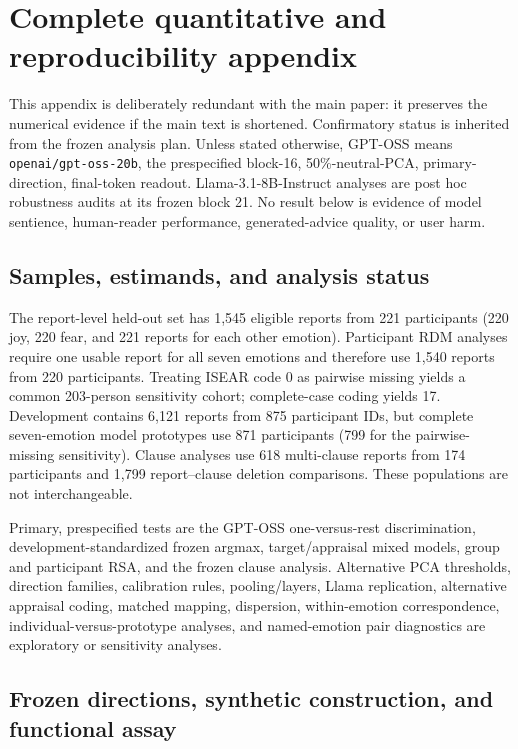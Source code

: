 \appendix
\section{Complete quantitative and reproducibility appendix}
\label{app:complete}

This appendix is deliberately redundant with the main paper: it preserves the numerical evidence if the main text is shortened. Confirmatory status is inherited from the frozen analysis plan. Unless stated otherwise, GPT-OSS means \texttt{openai/gpt-oss-20b}, the prespecified block-16, 50\%-neutral-PCA, primary-direction, final-token readout. Llama-3.1-8B-Instruct analyses are post hoc robustness audits at its frozen block 21. No result below is evidence of model sentience, human-reader performance, generated-advice quality, or user harm.

\subsection{Samples, estimands, and analysis status}
\label{app:denominators}

The report-level held-out set has 1,545 eligible reports from 221 participants (220 joy, 220 fear, and 221 reports for each other emotion). Participant RDM analyses require one usable report for all seven emotions and therefore use 1,540 reports from 220 participants. Treating ISEAR code 0 as pairwise missing yields a common 203-person sensitivity cohort; complete-case coding yields 17. Development contains 6,121 reports from 875 participant IDs, but complete seven-emotion model prototypes use 871 participants (799 for the pairwise-missing sensitivity). Clause analyses use 618 multi-clause reports from 174 participants and 1,799 report--clause deletion comparisons. These populations are not interchangeable.

Primary, prespecified tests are the GPT-OSS one-versus-rest discrimination, development-standardized frozen argmax, target/appraisal mixed models, group and participant RSA, and the frozen clause analysis. Alternative PCA thresholds, direction families, calibration rules, pooling/layers, Llama replication, alternative appraisal coding, matched mapping, dispersion, within-emotion correspondence, individual-versus-prototype analyses, and named-emotion pair diagnostics are exploratory or sensitivity analyses.

\subsection{Frozen directions, synthetic construction, and functional assay}
\label{app:frozen-directions}

